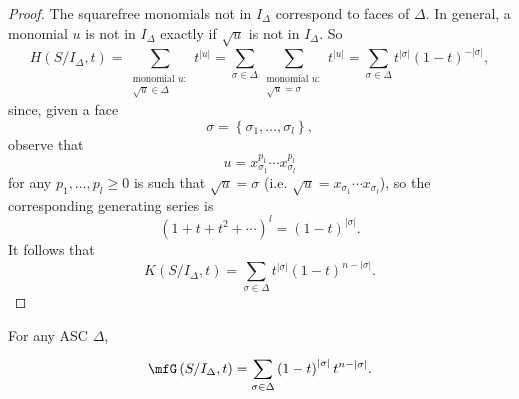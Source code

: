 \documentclass[co439]{subfiles}
\begin{document}
    \begin{proof}
        The squarefree monomials not in $I_{\Delta}$ correspond to faces of $\Delta$. In general, a monomial $u$ is not in $I_{\Delta}$ exactly if $\sqrt{u}$ is not in $I_{\Delta}$. So
        \begin{equation*}
            H\left( S /I_{\Delta}, t \right) = \sum^{}_{\substack{\text{monomial }u:\\\sqrt{u}\in\Delta}} t^{\left| u \right|} = \sum^{}_{\sigma\in\Delta} \sum^{}_{\substack{\text{monomial }u:\\\sqrt{u}=\sigma}} t^{\left| u \right|} = \sum^{}_{\sigma\in\Delta} t^{\left| \sigma \right|}\left( 1-t \right)^{-\left| \sigma \right|},
        \end{equation*}
        since, given a face
        \begin{equation*}
            \sigma = \left\lbrace \sigma_1,\ldots,\sigma_l \right\rbrace,
        \end{equation*}
        observe that
        \begin{equation*}
            u = x_{\sigma_1}^{p_1}\cdots x_{\sigma_l}^{p_l}
        \end{equation*}
        for any $p_1,\ldots,p_l\geq 0$ is such that $\sqrt{u} = \sigma$ (i.e. $\sqrt{u} = x_{\sigma_1}\cdots x_{\sigma_l}$), so the corresponding generating series is
        \begin{equation*}
            \left( 1+t+t^{2}+\cdots \right)^l = \left( 1-t \right)^{\left| \sigma \right|} .
        \end{equation*}
        It follows that
        \begin{equation*}
            K\left( S /I_{\Delta},t  \right) = \sum^{}_{\sigma\in\Delta} t^{\left| \sigma \right|}\left( 1-t \right)^{n-\left| \sigma \right|}.
        \end{equation*}
    \end{proof}

    \begin{cor}{}
        For any ASC $\Delta$,
        \begin{equation*} \mfG\left( S /I_{\Delta}, t \right) = \sum^{}_{\sigma\in\Delta} \left( 1-t \right)^{\left| \sigma \right|}t^{n-\left| \sigma \right|}.
        \end{equation*}
    \end{cor}	

    \rruleline
    
\end{document}
